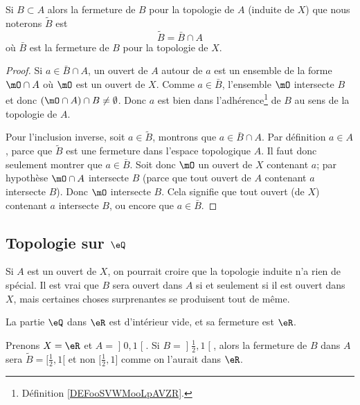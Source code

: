 \begin{lemma}       \label{LemkUYkQt}
	Si \( B\subset A\) alors la fermeture de \( B\) pour la topologie de \( A\) (induite de \( X\)) que nous noterons \( \tilde B\) est
	\begin{equation}
		\tilde B=\bar B\cap A
	\end{equation}
	où \( \bar B\) est la fermeture de \( B\) pour la topologie de \( X\).
\end{lemma}

\begin{proof}
	Si \( a\in \bar B\cap A\), un ouvert de \( A\) autour de \( a\) est un ensemble de la forme \( \mO\cap A\) où \( \mO\) est un ouvert de \( X\). Comme \( a\in\bar B\), l'ensemble \( \mO\) intersecte \( B\) et donc \( (\mO\cap A)\cap B\neq \emptyset\). Donc \( a\) est bien dans l'adhérence\footnote{Définition \ref{DEFooSVWMooLpAVZR}.} de \( B\) au sens de la topologie de \( A\).

	Pour l'inclusion inverse, soit \( a\in \tilde  B\), montrons que \( a\in \bar B\cap A\). Par définition \( a\in A\), parce que \( \tilde B\) est une fermeture dans l'espace topologique \( A\). Il faut donc seulement montrer que \( a\in\bar B\). Soit donc \( \mO\) un ouvert de \( X\) contenant \( a\); par hypothèse \( \mO\cap A\) intersecte \( B\) (parce que tout ouvert de \( A\) contenant \( a\) intersecte \( B\)). Donc \( \mO\) intersecte \( B\). Cela signifie que tout ouvert (de \( X\)) contenant \( a\) intersecte \( B\), ou encore que \( a\in \bar B\).
\end{proof}

\subsection{Topologie sur \( \eQ\)}

Si \( A\) est un ouvert de \( X\), on pourrait croire que la topologie induite n'a rien de spécial. Il est vrai que \( B\) sera ouvert dans \( A\) si et seulement si il est ouvert dans \( X\), mais certaines choses surprenantes se produisent tout de même.

\begin{lemma}       \label{LEMooIGQCooOrroHT}
	La partie \( \eQ\) dans \( \eR\) est d'intérieur vide, et sa fermeture est \( \eR\).
\end{lemma}

\begin{example} \label{ExloeyoR}
	Prenons \( X=\eR\) et \( A=\mathopen] 0 , 1 \mathclose[\). Si \( B=\mathopen] \frac{ 1 }{2} , 1 \mathclose[ \), alors la fermeture de \( B\) dans \( A\) sera \( \tilde B=\mathopen[ \frac{ 1 }{2} , 1 [\) et non \( \mathopen[ \frac{ 1 }{2} , 1 \mathclose]\) comme on l'aurait dans \( \eR\).
\end{example}

